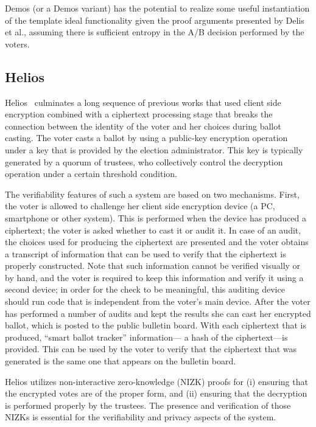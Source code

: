 Demos (or a Demos variant) has the potential to realize some useful
instantiation of the template ideal functionality given the proof
arguments presented by Delis et al., assuming there is sufficient
entropy in the A/B decision performed by the voters.

\subsection{Helios}

Helios~\cite{adida2008} culminates a long sequence of previous works
that used client side encryption combined with a ciphertext processing
stage that breaks the connection between the identity of the voter and
her choices during ballot casting. The voter casts a ballot by using a
public-key encryption operation under a key that is provided by the
election administrator. This key is typically generated by a quorum of
trustees, who collectively control the decryption operation under a
certain threshold condition.

The verifiability features of such a system are based on two
mechanisms. First, the voter is allowed to challenge her client side
encryption device (a PC, smartphone or other system). This is
performed when the device has produced a ciphertext; the voter is
asked whether to cast it or audit it. In case of an audit, the choices
used for producing the ciphertext are presented and the voter obtains
a transcript of information that can be used to verify that the
ciphertext is properly constructed. Note that such information cannot
be verified visually or by hand, and the voter is required to keep
this information and verify it using a second device; in order for the
check to be meaningful, this auditing device should run code that is
independent from the voter's main device. After the voter has
performed a number of audits and kept the results she can cast her
encrypted ballot, which is posted to the public bulletin board. With
each ciphertext that is produced, ``smart ballot tracker''
information--- a hash of the ciphertext---is provided. This can be
used by the voter to verify that the ciphertext that was generated is
the same one that appears on the bulletin board.

Helios utilizes non-interactive zero-knowledge (NIZK) proofs for (i)
ensuring that the encrypted votes are of the proper form, and (ii)
ensuring that the decryption is performed properly by the
trustees. The presence and verification of those NIZKs is essential
for the verifiability and privacy aspects of the system.

